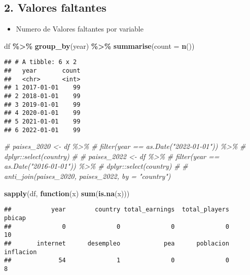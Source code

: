 \documentclass[
]{article}
\newenvironment{Shaded}{\begin{snugshade}}{\end{snugshade}}
\newcommand{\AttributeTok}[1]{\textcolor[rgb]{0.13,0.29,0.53}{#1}}
\newcommand{\CommentTok}[1]{\textcolor[rgb]{0.56,0.35,0.01}{\textit{#1}}}
\newcommand{\ControlFlowTok}[1]{\textcolor[rgb]{0.13,0.29,0.53}{\textbf{#1}}}
\newcommand{\FunctionTok}[1]{\textcolor[rgb]{0.13,0.29,0.53}{\textbf{#1}}}
\newcommand{\NormalTok}[1]{#1}
\newcommand{\SpecialCharTok}[1]{\textcolor[rgb]{0.81,0.36,0.00}{\textbf{#1}}}
\providecommand{\tightlist}{%
  \setlength{\itemsep}{0pt}\setlength{\parskip}{0pt}}
\begin{document}
\subsection{2. Valores faltantes}\label{valores-faltantes}

\begin{itemize}
\tightlist
\item
  Numero de Valores faltantes por variable
\end{itemize}

\begin{Shaded}
\begin{Highlighting}[]
\NormalTok{df }\SpecialCharTok{\%\textgreater{}\%} 
  \FunctionTok{group\_by}\NormalTok{(year) }\SpecialCharTok{\%\textgreater{}\%} 
  \FunctionTok{summarise}\NormalTok{(}\AttributeTok{count =} \FunctionTok{n}\NormalTok{())}
\end{Highlighting}
\end{Shaded}

\begin{verbatim}
## # A tibble: 6 x 2
##   year       count
##   <chr>      <int>
## 1 2017-01-01    99
## 2 2018-01-01    99
## 3 2019-01-01    99
## 4 2020-01-01    99
## 5 2021-01-01    99
## 6 2022-01-01    99
\end{verbatim}

\begin{Shaded}
\begin{Highlighting}[]
\CommentTok{\# paises\_2020 \textless{}{-} df \%\textgreater{}\% }
\CommentTok{\#   filter(year == as.Date("2022{-}01{-}01")) \%\textgreater{}\% }
\CommentTok{\#   dplyr::select(country)}
\CommentTok{\# }
\CommentTok{\# paises\_2022 \textless{}{-} df \%\textgreater{}\% }
\CommentTok{\#   filter(year == as.Date("2016{-}01{-}01")) \%\textgreater{}\% }
\CommentTok{\#   dplyr::select(country)}
\CommentTok{\# }
\CommentTok{\# anti\_join(paises\_2020, paises\_2022, by = "country")}
\end{Highlighting}
\end{Shaded}

\begin{Shaded}
\begin{Highlighting}[]
\FunctionTok{sapply}\NormalTok{(df, }\ControlFlowTok{function}\NormalTok{(x) }\FunctionTok{sum}\NormalTok{(}\FunctionTok{is.na}\NormalTok{(x)))}
\end{Highlighting}
\end{Shaded}

\begin{verbatim}
##           year        country total_earnings  total_players         pbicap 
##              0              0              0              0             10 
##       internet      desempleo            pea      poblacion      inflacion 
##             54              1              0              0              8
\end{verbatim}
\end{document}
